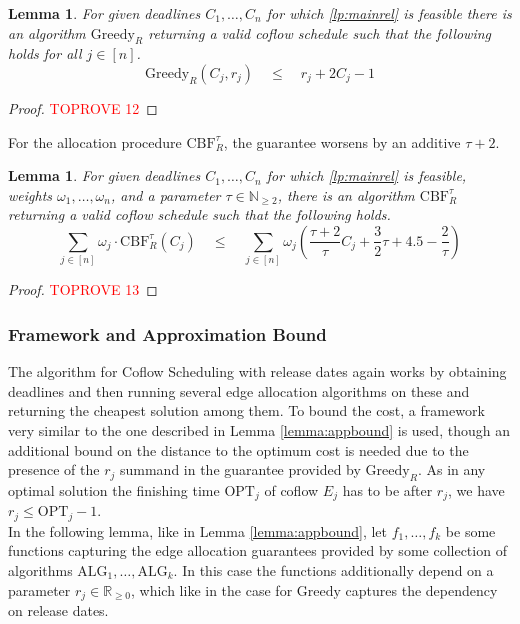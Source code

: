 \documentclass[11pt]{article}
\newtheorem{lemma}[theorem]{Lemma}
\begin{document}
\begin{lemma}
For given deadlines $C_1,\dotsc,C_n$ for which \ref{lp:mainrel} is feasible there is an algorithm $\mathrm{Greedy}_R$ returning a valid coflow schedule such that the following holds for all  $j \in [n]$.
\begin{equation*}
\mathrm{Greedy}_R(C_j, r_j) \quad \le \quad r_j + 2C_j-1
\end{equation*}
\end{lemma}
\begin{proof}\textcolor{red}{TOPROVE 12}\end{proof}


\noindent For the allocation procedure $\mathrm{CBF}^\tau_R$, the guarantee worsens by an additive $\tau+2$. 

\begin{lemma}\label{lemma:cbfrelapprox}
For given deadlines $C_1,\dotsc,C_n$ for which \ref{lp:mainrel} is feasible, weights $\omega_1,\dotsc,\omega_n$, and a parameter $\tau \in \mathbb{N}_{\ge 2}$, there is an algorithm $\mathrm{CBF}_R^\tau$ returning a valid coflow schedule such that the following holds.
\begin{equation*}
   \sum_{j \in [n]} \omega_j \cdot \mathrm{CBF}_R^\tau(C_j) \quad \le \quad \sum_{j \in [n]}\omega_j \left(\frac{\tau+2}{\tau}C_j + \frac{3}{2}\tau + 4.5 - \frac{2}{\tau}\right)
\end{equation*}
\end{lemma}
\begin{proof}\textcolor{red}{TOPROVE 13}\end{proof}

\subsubsection*{Framework and Approximation Bound}
The algorithm for Coflow Scheduling with release dates again works by obtaining deadlines and then running several edge allocation algorithms on these and returning the cheapest solution among them. To bound the cost, a framework very similar to the one described in Lemma \ref{lemma:appbound} is used, though an additional bound on the distance to the optimum cost is needed due to the presence of the $r_j$ summand in the guarantee provided by $\mathrm{Greedy}_R$. As in any optimal solution the finishing time $\mathrm{OPT}_j$ of coflow $E_j$ has to be after $r_j$, we have $r_j \le \mathrm{OPT}_j - 1$.\\

In the following lemma, like in Lemma \ref{lemma:appbound}, let $f_1,\dotsc,f_k$ be some functions capturing the edge allocation guarantees provided by some collection of algorithms $\mathrm{ALG}_1,\dotsc,\mathrm{ALG}_k$. In this case the functions additionally depend on a parameter $r_j \in \mathbb{R}_{\ge 0}$, which like in the case for $\mathrm{Greedy}$ captures the dependency on release dates.
\end{document}
